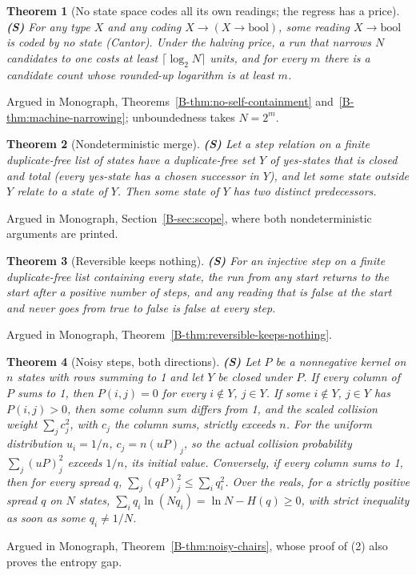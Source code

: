 \documentclass[11pt, a4paper]{report}
\theoremstyle{definition}
\theoremstyle{plain}
\newtheorem{theorem}{Theorem}[chapter]
\begin{document}
\begin{theorem}[No state space codes all its own readings; the regress has a price] \textbf{(S)}
For any type $X$ and any coding $X \to (X \to \mathrm{bool})$, some reading $X \to \mathrm{bool}$ is coded by no state (Cantor). Under the halving price, a run that narrows $N$ candidates to one costs at least $\lceil \log_2 N \rceil$ units, and for every $m$ there is a candidate count whose rounded-up logarithm is at least $m$.
\end{theorem}
\noindent Argued in Monograph, Theorems~\ref{B-thm:no-self-containment} and~\ref{B-thm:machine-narrowing};
unboundedness takes $N = 2^m$.

\begin{theorem}[Nondeterministic merge] \textbf{(S)}
Let a step relation on a finite duplicate-free list of states have a duplicate-free set $Y$ of yes-states that is closed and total (every yes-state has a chosen successor in $Y$), and let some state outside $Y$ relate to a state of $Y$. Then some state of $Y$ has two distinct predecessors.
\end{theorem}
\noindent Argued in Monograph, Section~\ref{B-sec:scope}, where both nondeterministic arguments are printed.

\begin{theorem}[Reversible keeps nothing] \textbf{(S)}
For an injective step on a finite duplicate-free list containing every state, the run from any start returns to the start after a positive number of steps, and any reading that is false at the start and never goes from true to false is false at every step.
\end{theorem}
\noindent Argued in Monograph, Theorem~\ref{B-thm:reversible-keeps-nothing}.

\begin{theorem}[Noisy steps, both directions] \textbf{(S)}
Let $P$ be a nonnegative kernel on $n$ states with rows summing to 1 and let $Y$ be closed under $P$. If every column of $P$ sums to 1, then $P(i,j) = 0$ for every $i \notin Y$, $j \in Y$. If some $i \notin Y$, $j \in Y$ has $P(i,j) > 0$, then some column sum differs from 1, and the scaled collision weight $\sum_j c_j^2$, with $c_j$ the column sums, strictly exceeds $n$. For the uniform distribution $u_i=1/n$, $c_j=n(uP)_j$, so the actual collision probability $\sum_j(uP)_j^2$ exceeds $1/n$, its initial value. Conversely, if every column sums to 1, then for every spread $q$, $\sum_j (qP)_j^2 \le \sum_i q_i^2$. Over the reals, for a strictly positive spread $q$ on $N$ states, $\sum_i q_i \ln(N q_i) = \ln N - H(q) \ge 0$, with strict inequality as soon as some $q_i \ne 1/N$.
\end{theorem}
\noindent Argued in Monograph, Theorem~\ref{B-thm:noisy-chairs}, whose proof of (2) also proves the
entropy gap.
\end{document}

